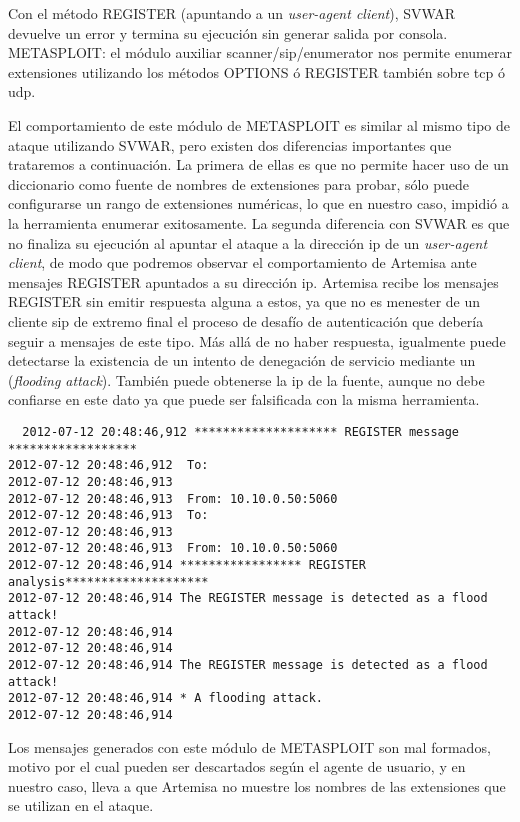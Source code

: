 \documentclass[a4paper,12pt]{report}
\newenvironment{myscriptlisting}
{\begin{list}{}{\setlength{\leftmargin}{1em}}\item\scriptsize\bfseries}
{\end{list}}
\begin{document}
Con el método REGISTER (apuntando a un \emph{user-agent client}), SVWAR devuelve
 un error y termina su ejecución sin generar salida por consola.\\

METASPLOIT: el módulo auxiliar scanner/\ac{sip}/enumerator nos permite enumerar extensiones 
utilizando los métodos OPTIONS ó REGISTER también sobre \ac{tcp} ó \ac{udp}.

El comportamiento de este módulo de METASPLOIT es similar al mismo tipo de 
ataque utilizando SVWAR, pero existen dos diferencias importantes que trataremos
a continuación. La primera de ellas es que no permite hacer uso de un
diccionario como fuente de nombres de extensiones para probar, sólo puede
configurarse un rango de extensiones numéricas, lo que en nuestro caso, impidió
a la herramienta enumerar exitosamente. La segunda diferencia con SVWAR es que
no finaliza su ejecución al apuntar el ataque a la dirección \ac{ip} de un
\emph{user-agent client}, de modo que podremos observar el comportamiento de
Artemisa ante mensajes REGISTER apuntados a su dirección \ac{ip}.
Artemisa recibe los mensajes REGISTER sin emitir respuesta alguna a estos, ya que no es 
menester de un cliente \ac{sip} de extremo final el proceso de desafío de
autenticación que debería seguir a mensajes de este tipo. 
Más allá de no haber  respuesta, igualmente puede detectarse la existencia de un
 intento de denegación de servicio mediante un (\emph{flooding
attack}). También puede obtenerse la \ac{ip} de la fuente, aunque no debe confiarse en
este dato ya que puede ser falsificada con la misma herramienta. 

\begin{myscriptlisting}
 \begin{verbatim}
  2012-07-12 20:48:46,912 ******************** REGISTER message ******************
2012-07-12 20:48:46,912  To: 
2012-07-12 20:48:46,913 
2012-07-12 20:48:46,913  From: 10.10.0.50:5060
2012-07-12 20:48:46,913  To: 
2012-07-12 20:48:46,913 
2012-07-12 20:48:46,913  From: 10.10.0.50:5060
2012-07-12 20:48:46,914 ***************** REGISTER analysis********************
2012-07-12 20:48:46,914 The REGISTER message is detected as a flood attack!
2012-07-12 20:48:46,914 
2012-07-12 20:48:46,914 
2012-07-12 20:48:46,914 The REGISTER message is detected as a flood attack!
2012-07-12 20:48:46,914 * A flooding attack.
2012-07-12 20:48:46,914 
 \end{verbatim}
\end{myscriptlisting}

Los mensajes generados con este módulo de METASPLOIT son mal formados, motivo 
por el cual pueden ser descartados según el agente de usuario, y en nuestro
caso, lleva a que Artemisa no muestre los nombres de las extensiones que se
utilizan en el ataque.
\end{document}
